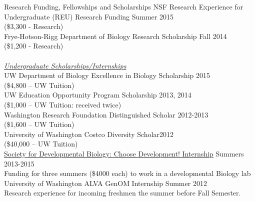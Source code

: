 \documentclass{resume} %
\newcommand{\tab}[1]{\hspace{.2667\textwidth}\rlap{#1}}
\newcommand{\itab}[1]{\hspace{0em}\rlap{#1}}
\newcommand\ntab[1][.25cm]{\hspace*{#1}}
\begin{document}
\begin{rSection}{Research Funding, Fellowships and Scholarships}
NSF Research Experience for Undergraduate (REU) Research Funding \hfill	Summer 2015 \\
\ntab(\$3,300 - Research) \\
Frye-Hotson-Rigg Department of Biology Research Scholarship \hfill Fall 2014 \\
\ntab(\$1,200 - Research) \\
\\
\underline{\textit{Undergraduate Scholarships/Internships} } \\
UW Department of Biology Excellence in Biology Scholarship \hfill 2015 \\
\ntab(\$4,800 – UW Tuition) \\
UW Education Opportunity Program Scholarship \hfill 2013, 2014 \\
\ntab(\$1,000 – UW Tuition: received twice) \\
Washington Research Foundation Distinguished Scholar \hfill 2012-2013 \\
\ntab(\$1,600 – UW Tuition) \\
University of Washington Costco Diversity Scholar\hfill 2012 \\
\ntab(\$40,000 – UW Tuition) \\
\href{https://www.sdbonline.org/choose_development_fellows}{Society for Developmental Biology: Choose Development! Internship} \hfill Summers 2013-2015 \\
\ntab Funding for three summers (\$4000 each) to work in a developmental Biology lab  \\
University of Washington ALVA GenOM Internship \hfill Summer 2012 \\
\ntab Research experience for incoming freshmen the summer before Fall Semester. 
\end{rSection}

\end{document}
